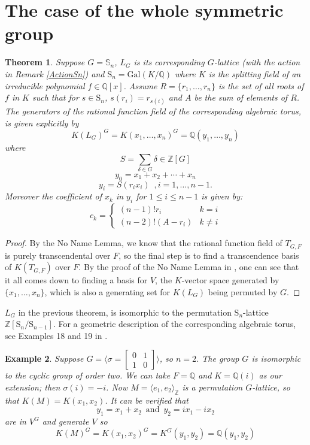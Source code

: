 \documentclass[12pt]{article}
\theoremstyle{plain}
\newtheorem{theorem}{Theorem}
\newtheorem{example}[theorem]{Example}
\newcommand{\Z}{\ensuremath{\mathbb{Z}}}
\newcommand{\Q}{\ensuremath{\mathbb{Q}}}
\begin{document}
\section{The case of the whole symmetric group}
 

\begin{theorem}\label{specialcase}
  Suppose $G = \mathbb{S}_n$, $L_G$ is its corresponding $G$-lattice
  (with the action in Remark \ref{ActionSn}) and $ \mathrm{S}_n =
  \mathrm{Gal}(K/\Q)$ where $K$ is the splitting field of an
  irreducible polynomial $ f \in \Q[x]$. Assume $R = \lbrace r_1,
  \ldots, r_n \rbrace$ is the set of all roots of $f$ in $K$ such that
  for $s \in \mathrm{S}_n$, $s(r_i) = r_{s(i)}$ and $A$ be the sum of
  elements of $R$. The generators of the rational function field of
  the corresponding algebraic torus, is given explicitly by$$K(L_G)^G
  = K(x_1, \ldots, x_n)^G = \Q(y_1, \ldots, y_n) $$ where $$S=
  \sum_{\delta \in G} \delta \in \Z[G]$$
  $$y_0 = x_1+ x_2+ \cdots + x_n$$
  $$ y_i = S(r_ix_i) \,\,\, , i = 1, \ldots, n-1.$$ Moreover the
  coefficient of $x_k$ in $y_i$ for $1 \leq i \leq n-1$ is given by:$$
  c_k = \begin{cases} (n-1)!r_i & k=i \\ (n-2)!(A-r_i) & k\neq
    i \end{cases}$$
\end{theorem}
\begin{proof}
  By the No Name Lemma, we know that the rational function field of
  $T_{G,F}$ is purely transcendental over $F$, so the final step is to
  find a transcendence basis of $K(T_{G,F})$ over $F$. By the proof of
  the No Name Lemma in \cite{Lenstra}, one can see that it all comes
  down to finding a basis for $V$, the $K$-vector space generated by
  $\lbrace x_1, \ldots, x_n \rbrace$, which is also a generating set
  for $K(L_G)$ being permuted by $G$.
\end{proof}


$L_G$ in the previous theorem, is isomorphic to the permutation
$\mathrm{S}_n$-lattice $\Z[\mathrm{S}_n/\mathrm{S}_{n-1}]$. For a
geometric description of the corresponding algebraic torus, see
Examples 18 and 19 in \cite{Voskresenskii}.


\begin{example}	
Suppose $G = \langle \sigma = \begin{bmatrix}
0&1\\
1&0
\end{bmatrix}\rangle$, so $n = 2$. 
The group $G$ is isomorphic to the cyclic group of order two. We can
take $F = \Q$ and $K = \Q(i)$ as our extension; then $\sigma(i) =
-i$. Now $M = \langle e_1, e_2 \rangle_{\Z}$ is a permutation
$G$-lattice, so that $K(M) = K(x_1,x_2)$. It can be verified
that $$y_1 = x_1+x_2\,\,\, \textrm{and}\,\,\, y_2 = ix_1 -ix_2 $$ are
in $V^G$ and generate $V$ so $$K(M)^G = K(x_1,x_2)^G = K^G(y_1,y_2) =
\Q(y_1,y_2)$$
\end{example}
\end{document}
